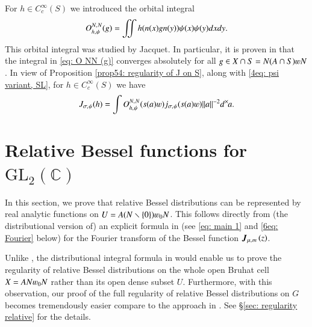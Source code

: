 \documentclass{amsproc}
\newcommand{\BC}{{\mathbb {C}}} \newcommand{\BD}{{\mathbb {D}}}
\newcommand{\GL}{{\mathrm {GL}}} \newcommand{\PGL}{{\mathrm {PGL}}}
\def\lp {\left (}
\def\rp {\right )}
\def\bfJ {\boldsymbol J}
\def\shskip{\hskip 0.5 pt}
\def\dx{d^{\times} \hskip -1 pt}
\theoremstyle{plain}
\numberwithin{equation}{section}
\begin{document}
For $h \in C_c^{\infty} (S)$ we introduced the orbital integral
\begin{align}\label{eq: O NN (g)}
O^{N, \shskip N}_{h, \shskip \psi} (g) = \iint      h (n(x) g   n(y) ) \psi (x) \psi (y) d x d y.
\end{align}
This orbital integral was studied by Jacquet. In particular, it is proven in \cite{Jacquet-RTF}
that the integral in \eqref{eq: O NN (g)} converges absolutely for all $g \in  X \cap S = N (A\cap S) \varw N$. In view of Proposition \ref{prop54: regularity of J on S}, along with \eqref{4eq: psi variant, SL}, for $h \in C_c^{\infty} (S)$ we have
\begin{align}\label{eq: J = int O}
J_{\sigma,\shskip \psi} (h) = \int  O^{N, \shskip N}_{h, \shskip \psi} (s(a) \varw) j_{\sigma,\shskip \psi} (s(a) \varw) \|a\|^{-2} \dx  a.
\end{align}

	
	\section{Relative Bessel functions for  $\GL_2 (\BC)$}\label{sec: relative Bessel functions}
	
	In this section,  we prove that    relative Bessel distributions  can be represented by  real analytic   functions on $U = A (N \smallsetminus \{0\} ) \varw_0 N$. This follows directly from (the distributional version of) an explicit formula in \cite{Qi-II-G} (see \eqref{eq: main 1} and \eqref{6eq: Fourier} below) for the Fourier transform of the Bessel function $\bfJ_{ \mu,\shskip   m} \lp z \rp$.
	
	Unlike \cite{BaruchMao-Real}, the distributional integral formula in \cite{Qi-II-G} would enable us to prove the regularity of  relative Bessel distributions on the whole open Bruhat cell $ X = A N \varw_0 N$ rather than its open dense subset $U$. Furthermore, with this observation,  our proof of  the  full regularity of   relative Bessel distributions on $G$ becomes tremendously easier compare to the approach in \cite{BaruchMao-Real}. See \S \ref{sec: regularity relative} for the details.
	
\end{document}
